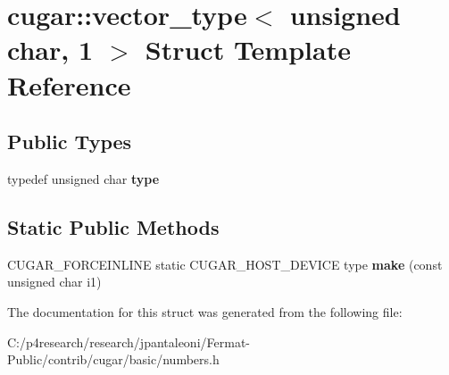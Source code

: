 \hypertarget{structcugar_1_1vector__type_3_01unsigned_01char_00_011_01_4}{}\section{cugar\+:\+:vector\+\_\+type$<$ unsigned char, 1 $>$ Struct Template Reference}
\label{structcugar_1_1vector__type_3_01unsigned_01char_00_011_01_4}
\subsection*{Public Types}
\begin{DoxyCompactItemize}
\item 
\mbox{\label{structcugar_1_1vector__type_3_01unsigned_01char_00_011_01_4_a5e9b818d38155313946352428a45fa07}} 
typedef unsigned char {\bfseries type}
\end{DoxyCompactItemize}
\subsection*{Static Public Methods}
\begin{DoxyCompactItemize}
\item 
\mbox{\label{structcugar_1_1vector__type_3_01unsigned_01char_00_011_01_4_a395d09776e3cc547db42e15890c63fb2}} 
C\+U\+G\+A\+R\+\_\+\+F\+O\+R\+C\+E\+I\+N\+L\+I\+NE static C\+U\+G\+A\+R\+\_\+\+H\+O\+S\+T\+\_\+\+D\+E\+V\+I\+CE type {\bfseries make} (const unsigned char i1)
\end{DoxyCompactItemize}


The documentation for this struct was generated from the following file\+:\begin{DoxyCompactItemize}
\item 
C\+:/p4research/research/jpantaleoni/\+Fermat-\/\+Public/contrib/cugar/basic/numbers.\+h\end{DoxyCompactItemize}
